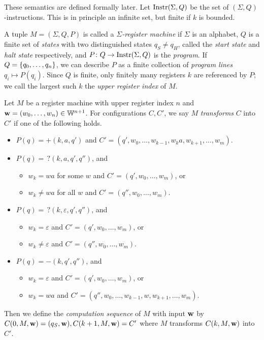 These semantics are defined formally later.
Let \( \operatorname{Instr}(\Sigma, Q) \) be the set of \( (\Sigma,Q) \)-instructions.
This is in principle an infinite set, but finite if \( k \) is bounded.
\begin{definition}
	A tuple \( M = (\Sigma, Q, P) \) is called a \emph{\( \Sigma \)-register machine} if \( \Sigma \) is an alphabet, \( Q \) is a finite set of \emph{states} with two distinguished states \( q_S \neq q_H \), called the \emph{start state} and \emph{halt state} respectively, and \( P \colon Q \to \operatorname{Instr}(\Sigma,Q) \) is the \emph{program}.
	If \( Q = \qty{q_0, \dots, q_n} \), we can describe \( P \) as a finite collection of \emph{program lines} \( q_i \mapsto P(q_i) \).
	Since \( Q \) is finite, only finitely many registers \( k \) are referenced by \( P \); we call the largest such \( k \) the \emph{upper register index} of \( M \).
\end{definition}
\begin{definition}
	Let \( M \) be a register machine with upper register index \( n \) and \( \vb w = (w_0, \dots, w_n) \in \mathbb W^{n+1} \).
	For configurations \( C, C' \), we say \( M \) \emph{transforms} \( C \) into \( C' \) if one of the following holds.
	\begin{itemize}
		\item \( P(q) = +(k,a,q') \) and \( C' = (q', w_0, \dots, w_{k-1}, w_k a, w_{k+1}, \dots, w_m) \).
		\item \( P(q) =\, ?(k,a,q',q'') \), and
		\begin{itemize}
			\item \( w_k = wa \) for some \( w \) and \( C' = (q',w_0, \dots, w_m) \), or
			\item \( w_k \neq wa \) for all \( w \) and \( C' = (q'', w_0, \dots, w_m) \).
		\end{itemize}
		\item \( P(q) =\, ?(k,\varepsilon,q',q'') \), and
		\begin{itemize}
			\item \( w_k = \varepsilon \) and \( C' = (q',w_0, \dots, w_m) \), or
			\item \( w_k \neq \varepsilon \) and \( C' = (q'', w_0, \dots, w_m) \).
		\end{itemize}
		\item \( P(q) = -(k,q',q'') \), and
		\begin{itemize}
			\item \( w_k = \varepsilon \) and \( C' = (q',w_0, \dots, w_m) \), or
			\item \( w_k = wa \) and \( C' = (q'', w_0, \dots, w_{k-1}, w, w_{k+1}, \dots, w_m) \).
		\end{itemize}
	\end{itemize}
	Then we define the \emph{computation sequence} of \( M \) with input \( \vb w \) by \( C(0,M,\vb w) = (q_S,\vb w), C(k+1,M,\vb w) = C' \) where \( M \) transforms \( C(k,M,\vb w) \) into \( C' \).
\end{definition}

